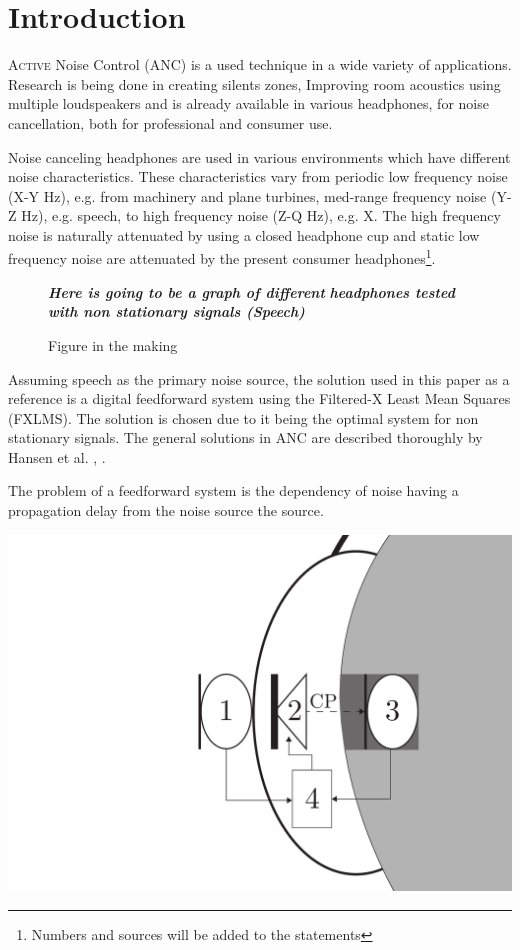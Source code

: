 \section{Introduction}
\lettrine[lines=2]{A}{ctive} Noise Control (ANC) is a used technique in a wide variety of applications. Research is being done in creating silents zones\cite{SilentZones}, Improving room acoustics using multiple loudspeakers\cite{CAPS} and is already available in various headphones, for noise cancellation, both for professional and consumer use. 

Noise canceling headphones are used in various environments which have different noise characteristics. These characteristics vary from periodic low frequency noise (X-Y Hz), e.g. from machinery and plane turbines, med-range frequency noise (Y-Z Hz), e.g. speech, to high frequency noise (Z-Q Hz), e.g. X. The high frequency noise is naturally attenuated by using a closed headphone cup and static low frequency noise are attenuated by the present consumer headphones\footnote{Numbers and sources will be added to the statements}.   

\begin{figure}[H]
	\centering
	\textbf{\textit{Here is going to be a graph of different}}
	\textbf{\textit{ headphones tested with non stationary signals (Speech)}}
	\caption{Figure in the making}
\end{figure}


Assuming speech as the primary noise source, the solution used in this paper as a reference is a digital feedforward system using the Filtered-X Least Mean Squares (FXLMS). The solution is chosen due to it being the optimal system for non stationary signals. The general solutions in ANC are described thoroughly by Hansen et al. \cite{Hansen2}, \cite{Hansen}.

The problem of a feedforward system is the dependency of noise having a propagation delay from the noise source the source. 

{
	\centering
	\includegraphics[width=0.5\columnwidth]{figures/ArticleIllustrations/BasicOverviewZoomed}
	\label{fig:SystemOverview}
}

